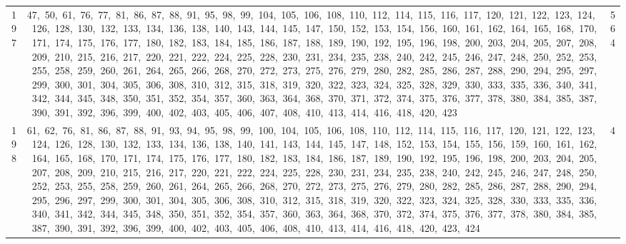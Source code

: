 \begin{longtable}{c|p{}|r}
197 & 47,\ 50,\ 61,\ 76,\ 77,\ 81,\ 86,\ 87,\ 88,\ 91,\ 95,\ 98,\ 99,\ 104,\ 105,\ 106,\ 108,\ 110,\ 112,\ 114,\ 115,\ 116,\ 117,\ 120,\ 121,\ 122,\ 123,\ 124,\ 126,\ 128,\ 130,\ 132,\ 133,\ 134,\ 136,\ 138,\ 140,\ 143,\ 144,\ 145,\ 147,\ 150,\ 152,\ 153,\ 154,\ 156,\ 160,\ 161,\ 162,\ 164,\ 165,\ 168,\ 170,\ 171,\ 174,\ 175,\ 176,\ 177,\ 180,\ 182,\ 183,\ 184,\ 185,\ 186,\ 187,\ 188,\ 189,\ 190,\ 192,\ 195,\ 196,\ 198,\ 200,\ 203,\ 204,\ 205,\ 207,\ 208,\ 209,\ 210,\ 215,\ 216,\ 217,\ 220,\ 221,\ 222,\ 224,\ 225,\ 228,\ 230,\ 231,\ 234,\ 235,\ 238,\ 240,\ 242,\ 245,\ 246,\ 247,\ 248,\ 250,\ 252,\ 253,\ 255,\ 258,\ 259,\ 260,\ 261,\ 264,\ 265,\ 266,\ 268,\ 270,\ 272,\ 273,\ 275,\ 276,\ 279,\ 280,\ 282,\ 285,\ 286,\ 287,\ 288,\ 290,\ 294,\ 295,\ 297,\ 299,\ 300,\ 301,\ 304,\ 305,\ 306,\ 308,\ 310,\ 312,\ 315,\ 318,\ 319,\ 320,\ 322,\ 323,\ 324,\ 325,\ 328,\ 329,\ 330,\ 333,\ 335,\ 336,\ 340,\ 341,\ 342,\ 344,\ 345,\ 348,\ 350,\ 351,\ 352,\ 354,\ 357,\ 360,\ 363,\ 364,\ 368,\ 370,\ 371,\ 372,\ 374,\ 375,\ 376,\ 377,\ 378,\ 380,\ 384,\ 385,\ 387,\ 390,\ 391,\ 392,\ 396,\ 399,\ 400,\ 402,\ 403,\ 405,\ 406,\ 407,\ 408,\ 410,\ 413,\ 414,\ 416,\ 418,\ 420,\ 423 & 564 \\
198 & 61,\ 62,\ 76,\ 81,\ 86,\ 87,\ 88,\ 91,\ 93,\ 94,\ 95,\ 98,\ 99,\ 100,\ 104,\ 105,\ 106,\ 108,\ 110,\ 112,\ 114,\ 115,\ 116,\ 117,\ 120,\ 121,\ 122,\ 123,\ 124,\ 126,\ 128,\ 130,\ 132,\ 133,\ 134,\ 136,\ 138,\ 140,\ 141,\ 143,\ 144,\ 145,\ 147,\ 148,\ 152,\ 153,\ 154,\ 155,\ 156,\ 159,\ 160,\ 161,\ 162,\ 164,\ 165,\ 168,\ 170,\ 171,\ 174,\ 175,\ 176,\ 177,\ 180,\ 182,\ 183,\ 184,\ 186,\ 187,\ 189,\ 190,\ 192,\ 195,\ 196,\ 198,\ 200,\ 203,\ 204,\ 205,\ 207,\ 208,\ 209,\ 210,\ 215,\ 216,\ 217,\ 220,\ 221,\ 222,\ 224,\ 225,\ 228,\ 230,\ 231,\ 234,\ 235,\ 238,\ 240,\ 242,\ 245,\ 246,\ 247,\ 248,\ 250,\ 252,\ 253,\ 255,\ 258,\ 259,\ 260,\ 261,\ 264,\ 265,\ 266,\ 268,\ 270,\ 272,\ 273,\ 275,\ 276,\ 279,\ 280,\ 282,\ 285,\ 286,\ 287,\ 288,\ 290,\ 294,\ 295,\ 296,\ 297,\ 299,\ 300,\ 301,\ 304,\ 305,\ 306,\ 308,\ 310,\ 312,\ 315,\ 318,\ 319,\ 320,\ 322,\ 323,\ 324,\ 325,\ 328,\ 330,\ 333,\ 335,\ 336,\ 340,\ 341,\ 342,\ 344,\ 345,\ 348,\ 350,\ 351,\ 352,\ 354,\ 357,\ 360,\ 363,\ 364,\ 368,\ 370,\ 372,\ 374,\ 375,\ 376,\ 377,\ 378,\ 380,\ 384,\ 385,\ 387,\ 390,\ 391,\ 392,\ 396,\ 399,\ 400,\ 402,\ 403,\ 405,\ 406,\ 408,\ 410,\ 413,\ 414,\ 416,\ 418,\ 420,\ 423,\ 424 & 4 \\

\end{longtable}
